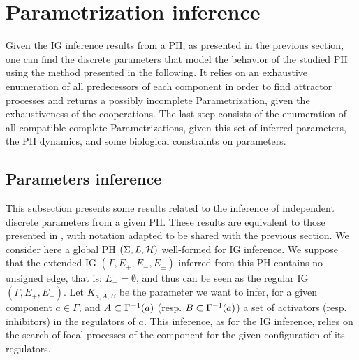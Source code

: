\section{Parametrization inference}\label{sec:infer-K}

Given the IG inference results from a PH, as presented in the previous section, one can find the discrete parameters that model the behavior of the studied PH using the method presented in the following.
It relies on an exhaustive enumeration of all predecessors of each component in order to find attractor processes and returns a possibly incomplete Parametrization, given the exhaustiveness of the cooperations.
The last step consists of the enumeration of all compatible complete Parametrizations, given this
set of inferred parameters, the PH dynamics, and some biological constraints on parameters.

\subsection{Parameters inference}

This subsection presents some results related to the inference of independent discrete parameters from a given PH. These results are equivalent to those presented in \cite{PMR10-TCSB}, with notation adapted to be shared with the previous section.
We consider here a global PH $(\Sigma,L,\mathcal{H})$ well-formed for IG inference. We suppose that the extended IG $(\Gamma, E_+, E_-, E_\pm)$ inferred from this PH contains no unsigned edge, that is: $E_\pm = \emptyset$, and thus can be seen as the regular IG $(\Gamma, E_+, E_-)$.
Let $K_{a,A,B}$ be the parameter we want to infer, for a given component $a \in \Gamma$,
and $A \subset \Gamma^{-1}(a)$ (resp. $B \subset \Gamma^{-1}(a)$) a set of activators (resp. inhibitors) in the regulators of $a$.
This inference, as for the IG inference, relies on the search of focal processes of the component for the given configuration of its regulators.


